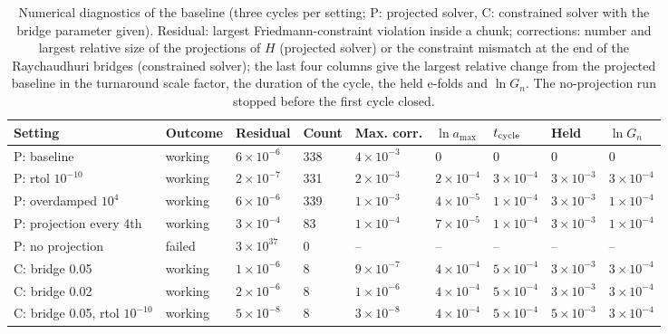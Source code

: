 \documentclass[11pt,a4paper]{article}
\begin{document}
\begin{table}[htbp]\centering\footnotesize\setlength{\tabcolsep}{3pt}
\caption{Numerical diagnostics of the baseline (three cycles per setting; P: projected solver, C: constrained solver with the bridge parameter given). Residual: largest Friedmann-constraint violation inside a chunk; corrections: number and largest relative size of the projections of $H$ (projected solver) or the constraint mismatch at the end of the Raychaudhuri bridges (constrained solver); the last four columns give the largest relative change from the projected baseline in the turnaround scale factor, the duration of the cycle, the held e-folds and $\ln G_n$. The no-projection run stopped before the first cycle closed.}
\begin{tabular}{lllllllll}
\toprule
Setting & Outcome & Residual & Count & Max. corr. & $\ln a_{\max}$ & $t_{\rm cycle}$ & Held & $\ln G_n$ \\ \midrule
P: baseline & working & $6\times10^{-6}$ & 338 & $4\times10^{-3}$ & 0 & 0 & 0 & 0 \\
P: rtol $10^{-10}$ & working & $2\times10^{-7}$ & 331 & $2\times10^{-3}$ & $2\times10^{-4}$ & $3\times10^{-4}$ & $3\times10^{-3}$ & $3\times10^{-4}$ \\
P: overdamped $10^4$ & working & $6\times10^{-6}$ & 339 & $1\times10^{-3}$ & $4\times10^{-5}$ & $1\times10^{-4}$ & $3\times10^{-3}$ & $1\times10^{-4}$ \\
P: projection every 4th & working & $3\times10^{-4}$ & 83 & $1\times10^{-4}$ & $7\times10^{-5}$ & $1\times10^{-4}$ & $3\times10^{-3}$ & $1\times10^{-4}$ \\
P: no projection & failed & $3\times10^{37}$ & 0 & -- & -- & -- & -- & -- \\
C: bridge 0.05 & working & $1\times10^{-6}$ & 8 & $9\times10^{-7}$ & $4\times10^{-4}$ & $5\times10^{-4}$ & $3\times10^{-3}$ & $3\times10^{-4}$ \\
C: bridge 0.02 & working & $2\times10^{-6}$ & 8 & $1\times10^{-6}$ & $4\times10^{-4}$ & $5\times10^{-4}$ & $3\times10^{-3}$ & $3\times10^{-4}$ \\
C: bridge 0.05, rtol $10^{-10}$ & working & $5\times10^{-8}$ & 8 & $3\times10^{-8}$ & $4\times10^{-4}$ & $5\times10^{-4}$ & $5\times10^{-3}$ & $3\times10^{-4}$ \\
\bottomrule
\end{tabular}
\end{table}
\end{document}
